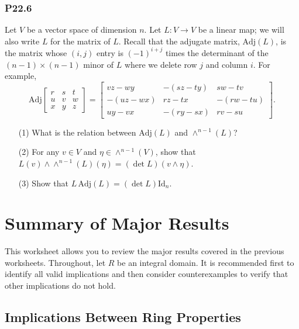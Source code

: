 \documentclass[lang=cn,11pt]{template}
\begin{document}
\subsection*{P22.6}
Let \( V \) be a vector space of dimension \( n \). Let \( L : V \rightarrow V \) be a linear map; we will also write \( L \) for the matrix of \( L \). Recall that the adjugate matrix, \( \text{Adj}(L) \), is the matrix whose \( (i, j) \) entry is \( (-1)^{i+j} \) times the determinant of the \( (n-1) \times (n-1) \) minor of \( L \) where we delete row \( j \) and column \( i \). For example,
\[
\text{Adj} \begin{bmatrix} r & s & t \\ u & v & w \\ x & y & z \end{bmatrix} = \begin{bmatrix} vz - wy & -(sz - ty) & sw - tv \\ -(uz - wx) & rz - tx & -(rw - tu) \\ uy - vx & -(ry - sx) & rv - su \end{bmatrix}.
\]
\begin{itemize}
    \item[(1)] What is the relation between \( \text{Adj}(L) \) and \( \wedge^{n-1}(L) \)?
    \item[(2)] For any \( v \in V \) and \( \eta \in \wedge^{n-1}(V) \), show that \( L(v) \wedge \wedge^{n-1}(L)(\eta) = (\det L)(v \wedge \eta) \).
    \item[(3)] Show that \( L \, \text{Adj}(L) = (\det L) \text{Id}_n \).
\end{itemize}










\chapter{Summary of Major Results}

This worksheet allows you to review the major results covered in the previous worksheets. Throughout, let \( R \) be an integral domain. It is recommended first to identify all valid implications and then consider counterexamples to verify that other implications do not hold.

\section{Implications Between Ring Properties}
\end{document}
